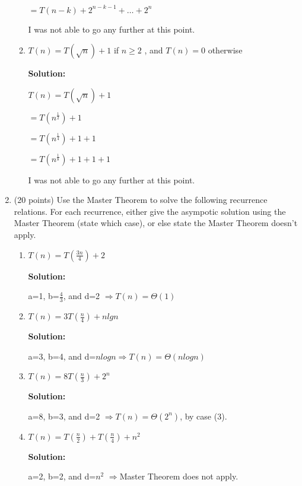 \documentclass[12pt]{article}
\begin{document}
\begin{enumerate}
\begin{enumerate}
		$= T(n-k)+2^{n-k-1}+\dots+2^{n}$\par
		I was not able to go any further at this point. \par
    	\item $T(n) = T(\sqrt{n}) + 1$ if $n\geq2$ , and $T(n) = 0$ otherwise\par
		\textbf{Solution:}\par
		$T(n) = T(\sqrt{n}) + 1$\par
		$= T(n^{\frac{1}{2}})+1$\par
		$= T(n^{\frac{1}{4}})+1+1$\par
		$= T(n^{\frac{1}{8}})+1+1+1$\par
		I was not able to go any further at this point.\par
    \end{enumerate}

    \newpage

    \item
	(20 points) Use the Master Theorem to solve the following recurrence relations. 
	For each recurrence, either give the asympotic solution using the Master Theorem (state which case), or 
	else state the Master Theorem doesn't apply.
    \begin{enumerate}
		\item $T(n) = T(\frac{3n}{4}) + 2$\par
		\textbf{Solution:}\par
		a=1, b=$\frac{4}{3}$, and d=2 $\Rightarrow T(n)=\Theta(1)$\par 
		
		\item $T(n) = 3T(\frac{n}{4}) + nlgn$\par
		\textbf{Solution:}\par
		a=3, b=4, and d=$nlogn \Rightarrow T(n)=\Theta(nlogn)$\par

		\item $T(n) = 8T(\frac{n}{3}) + 2^n$\par
		\textbf{Solution:}\par
		a=8, b=3, and d=2 $\Rightarrow T(n)=\Theta(2^{n})$, by case (3).\par 
		
		\item $T(n) = T(\frac{n}{2}) + T(\frac{n}{4}) + n^2$\par
		\textbf{Solution:}\par
		a=2, b=2, and d=$n^{2}$ $\Rightarrow $Master Theorem does not apply.\par 
		

\end{enumerate}
\end{enumerate}
\end{document}
